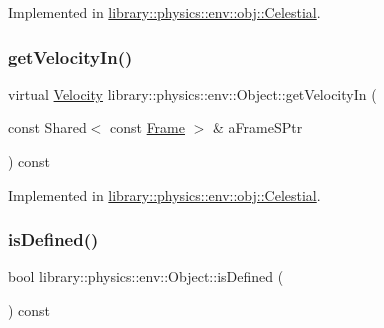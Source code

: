 Implemented in \hyperlink{classlibrary_1_1physics_1_1env_1_1obj_1_1_celestial_ac6676b10ebbb63a8483137c9c734c58a}{library\+::physics\+::env\+::obj\+::\+Celestial}.

\mbox{\label{classlibrary_1_1physics_1_1env_1_1_object_a1a8f4358db37b1b8830866373f8f3670}} 
\subsubsection{\texorpdfstring{get\+Velocity\+In()}{getVelocityIn()}}
{\footnotesize\ttfamily virtual \hyperlink{classlibrary_1_1physics_1_1coord_1_1_velocity}{Velocity} library\+::physics\+::env\+::\+Object\+::get\+Velocity\+In (\begin{DoxyParamCaption}\item[{const Shared$<$ const \hyperlink{classlibrary_1_1physics_1_1coord_1_1_frame}{Frame} $>$ \&}]{a\+Frame\+S\+Ptr }\end{DoxyParamCaption}) const\hspace{0.3cm}{\ttfamily [pure virtual]}}



Implemented in \hyperlink{classlibrary_1_1physics_1_1env_1_1obj_1_1_celestial_accaa3b1fdc39a1a058fd35006f31982d}{library\+::physics\+::env\+::obj\+::\+Celestial}.

\mbox{\label{classlibrary_1_1physics_1_1env_1_1_object_a7035edc921681401ddd43b094645a024}} 
\subsubsection{\texorpdfstring{is\+Defined()}{isDefined()}}
{\footnotesize\ttfamily bool library\+::physics\+::env\+::\+Object\+::is\+Defined (\begin{DoxyParamCaption}{ }\end{DoxyParamCaption}) const\hspace{0.3cm}{\ttfamily [virtual]}}



